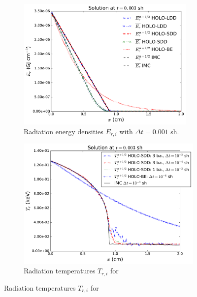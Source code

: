 \documentclass{anstrans}
\begin{document}
\begin{figure}[th!]
\centering
\begin{subfigure}{0.48\textwidth}
  \centering
  \vspace{-0.051in}
    \captionsetup{justification=centering,margin=1.5cm}
    \includegraphics[width=0.96\textwidth]{void_imc_compare.pdf}
    \caption{\label{fig:void_imc_compare} Radiation energy densities $E_{r,i}$  with
    $\Delta t=0.001$ sh.}
\end{subfigure}
\begin{subfigure}{0.48\textwidth}
  \centering
    \captionsetup{justification=centering,margin=1.0cm}
    \includegraphics[width=\textwidth]{void_temp_batch_compare.pdf}
    \caption{\hspace{0.1in}\label{fig:void_temp_compare} Radiation temperatures $T_{r,i}$ for
}
\end{subfigure}
\end{figure}
\end{document}

